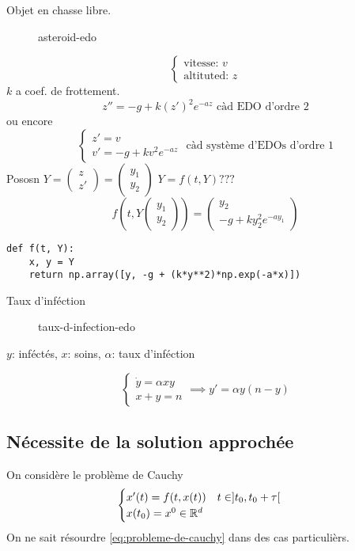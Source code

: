 \begin{eg} Objet en chasse libre.
\begin{figure}[H]
    \centering
    \caption{asteroid-edo}
    \label{fig:asteroid-edo}
\end{figure}
\[
\begin{cases}
    \text{vitesse: } v\\
    \text{altituted: } z
\end{cases}
\] 
$k$ a coef. de frottement.
 \[
     z'' = -g + k(z')^{2}e^{-az} \text{ càd EDO d'ordre } 2 
\] 
ou encore
\[
\begin{cases}
    z' = v\\
    v' = -g + kv^2e^{-az}
\end{cases}
\text{ càd système d'EDOs d'ordre 1}
\] 
Pososn $Y = \begin{pmatrix} z \\ z' \end{pmatrix} = \begin{pmatrix} y_1 \\ y_2 \end{pmatrix}  $ $Y = f(t, Y)???$
 \[
     f(t, Y\begin{pmatrix} y_1 \\ y_2 \end{pmatrix} ) = \begin{pmatrix} y_2 \\ -g + ky_2^2e^{-ay_1} \end{pmatrix} 
\] 
\begin{lstlisting}
def f(t, Y):
    x, y = Y
    return np.array([y, -g + (k*y**2)*np.exp(-a*x)])
\end{lstlisting}
\end{eg}

\begin{eg}
   Taux d'inféction 
\begin{figure}[H]
    \centering
    \caption{taux-d-infection-edo}
    \label{fig:taux-d-infection-edo}
\end{figure}
$y$: inféctés,  $x$: soins,  $\alpha$: taux d'inféction

\[
\begin{cases}
    \dot{y} = \alpha x y\\
    x + y = n
\end{cases} \implies
y' = \alpha y (n - y)
\] 
\end{eg}
\subsection{Nécessite de la solution approchée}
On considère le problème de Cauchy
\begin{equation}\label{eq:probleme-de-cauchy}
    \begin{cases}
        x'(t) = f(t, x(t)) \quad t \in ]t_0, t_0 + \tau[\\
        x(t_0) = x^0 \in \mathbb{R}^d
    \end{cases}
\end{equation}
On ne sait résourdre \ref{eq:probleme-de-cauchy} dans des cas particulièrs.

